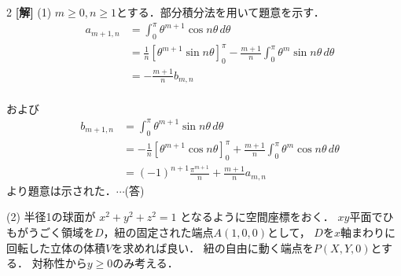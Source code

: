 \documentclass[../../main.tex]{subfiles}
\begin{document}
\setcounter{equation}{0}
\setcounter{figure}{0}
\setcounter{table}{0}
\begin{oframed}
  
\end{oframed}


\setlength{\columnseprule}{0.4pt}
\begin{multicols}{2}
  {\bf[解]}
  (1)
  $m \ge 0, n \ge 1$とする．部分積分法を用いて題意を示す．
  \begin{align*}
    \quad a_{m+1,n}
     & = \int_0^\pi \theta^{m+1} \cos n\theta \, d\theta                                                                        \\
     & = \frac{1}{n} \left[ \theta^{m+1} \sin n\theta \right]_0^\pi - \frac{m+1}{n} \int_0^\pi \theta^m \sin n\theta \, d\theta \\
     & = -\frac{m+1}{n} b_{m,n}
  \end{align*}                                                                                                                                                \\
  および
  \begin{align*}
    \quad b_{m+1,n}
     & = \int_0^\pi \theta^{m+1} \sin n\theta \, d\theta                                                                         \\
     & = -\frac{1}{n} \left[ \theta^{m+1} \cos n\theta \right]_0^\pi + \frac{m+1}{n} \int_0^\pi \theta^m \cos n\theta \, d\theta \\
     & = (-1)^{n+1} \frac{\pi^{m+1}}{n} + \frac{m+1}{n} a_{m,n}
  \end{align*}
  より題意は示された．$\cdots$(答)

  \vspace{10pt}
  (2)
  半径1の球面が $x^2+y^2+z^2=1$ となるように空間座標をおく．
  $xy$平面でひもがうごく領域を$D$，紐の固定された端点$A(1,0,0)$として，
  $D$を$x$軸まわりに回転した立体の体積$V$を求めれば良い．
  紐の自由に動く端点を$P(X,Y,0)$とする．
  対称性から$y \geq 0$のみ考える．

  \begin{figure}[H]
    \centering
\end{figure}
\end{multicols}
\end{document}
